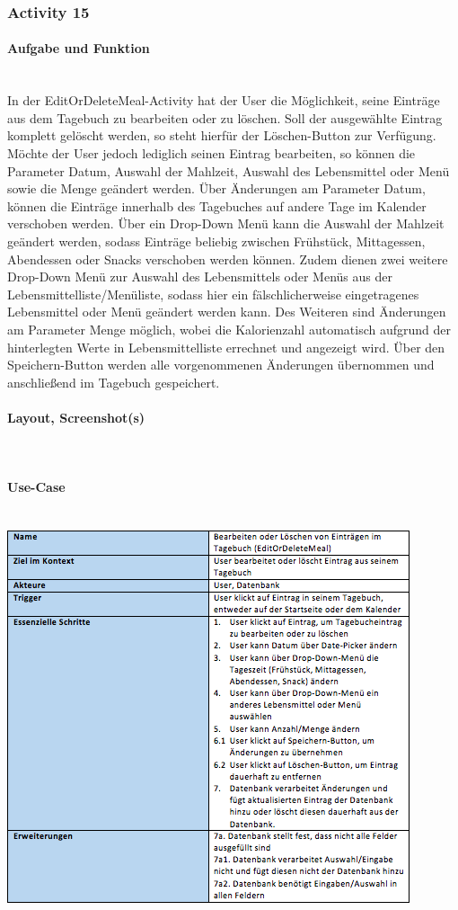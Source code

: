 \subsubsection{Activity 15}

\paragraph{Aufgabe und Funktion}\\
In der EditOrDeleteMeal-Activity hat der User die Möglichkeit, seine Einträge aus dem Tagebuch zu bearbeiten oder zu löschen. Soll der ausgewählte Eintrag komplett gelöscht werden, so steht hierfür der Löschen-Button zur Verfügung. Möchte der User jedoch lediglich seinen Eintrag bearbeiten, so können die Parameter Datum, Auswahl der Mahlzeit, Auswahl des Lebensmittel oder Menü sowie die Menge geändert werden. Über Änderungen am Parameter Datum, können die Einträge innerhalb des Tagebuches auf andere Tage im Kalender verschoben werden. Über ein Drop-Down Menü kann die Auswahl der Mahlzeit geändert werden, sodass Einträge beliebig zwischen Frühstück, Mittagessen, Abendessen oder Snacks verschoben werden können. Zudem dienen zwei weitere Drop-Down Menü zur Auswahl des Lebensmittels oder Menüs aus der Lebensmittelliste/Menüliste, sodass hier ein fälschlicherweise eingetragenes Lebensmittel oder Menü geändert werden kann. Des Weiteren sind Änderungen am Parameter Menge möglich, wobei die Kalorienzahl automatisch aufgrund der hinterlegten Werte in Lebensmittelliste errechnet und angezeigt wird. Über den Speichern-Button werden alle vorgenommenen Änderungen übernommen und anschließend im Tagebuch gespeichert.

\paragraph{Layout, Screenshot(s)}\\
\paragraph{Use-Case}$~~$\\
\newline
\includegraphics[scale=1]{img/usecaseeodmeal}\\
